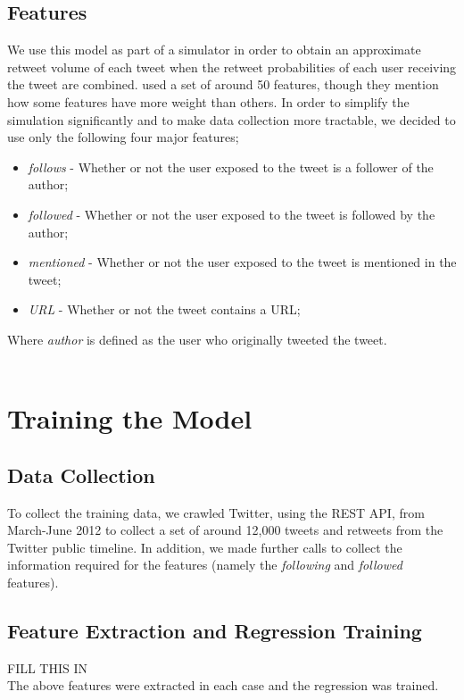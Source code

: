 \subsection{Features}
We use this model as part of a simulator in order to obtain an approximate retweet volume of each tweet when the retweet probabilities of each user receiving the tweet are combined. \cite{zhu11} used a set of around 50 features, though they mention how some features have more weight than others. In order to simplify the simulation significantly and to make data collection more tractable, we decided to use only the following four major features;
\begin{itemize}
\item \emph{follows} - Whether or not the user exposed to the tweet is a follower of the author;
\item \emph{followed} - Whether or not the user exposed to the tweet is followed by the author;
\item \emph{mentioned} - Whether or not the user exposed to the tweet is mentioned in the tweet;
\item \emph{URL} - Whether or not the tweet contains a URL;
\end{itemize}
Where \emph{author} is defined as the user who originally tweeted the tweet.
\\ \\ 


\section{Training the Model}
\subsection{Data Collection}
To collect the training data, we crawled Twitter, using the REST API, from March-June 2012 to collect a set of around 12,000 tweets and retweets from the Twitter public timeline. In addition, we made further calls to collect the information required for the features (namely the \textit{following} and \textit{followed} features). 

\subsection{Feature Extraction and Regression Training}
FILL THIS IN
\\
The above features were extracted in each case and the regression was trained.


